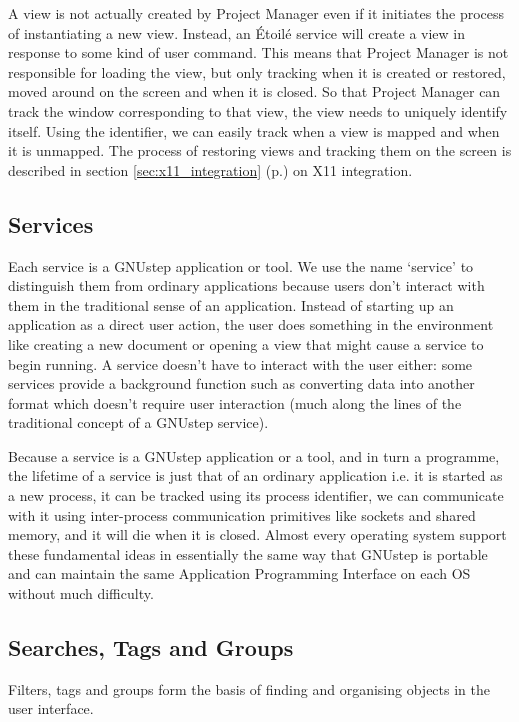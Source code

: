 \documentclass[11pt]{report}
\newcommand{\etoile}{\'Etoil\'e\xspace}
\newcommand{\proman}{Project Manager\xspace}
\newcommand{\gnustep}{GNUstep\xspace}
\begin{document}
A view is not actually created by \proman even if it initiates the process of instantiating a new view. Instead, an \etoile service will create a view in response to some kind of user command. This means that \proman is not responsible for loading the view, but only tracking when it is created or restored, moved around on the screen and when it is closed. So that \proman can track the window corresponding to that view, the view needs to uniquely identify itself. Using the identifier, we can easily track when a view is mapped and when it is unmapped. The process of restoring views and tracking them on the screen is described in section \ref{sec:x11_integration} (p.\pageref{sec:x11_integration}) on X11 integration.

\subsection{Services}
Each service is a GNUstep application or tool. We use the name `service' to distinguish them from ordinary applications because users don't interact with them in the traditional sense of an application. Instead of starting up an application as a direct user action, the user does something in the environment like creating a new document or opening a view that might cause a service to begin running. A service doesn't have to interact with the user either: some services provide a background function such as converting data into another format which doesn't require user interaction (much along the lines of the traditional concept of a \gnustep service).

Because a service is a GNUstep application or a tool, and in turn a programme, the lifetime of a service is just that of an ordinary application i.e. it is started as a new process, it can be tracked using its process identifier, we can communicate with it using inter-process communication primitives like sockets and shared memory, and it will die when it is closed. Almost every operating system support these fundamental ideas in essentially the same way that GNUstep is portable and can maintain the same Application Programming Interface on each OS without much difficulty.  

\subsection{Searches, Tags and Groups}
Filters, tags and groups form the basis of finding and organising objects in the user interface.
\end{document}
